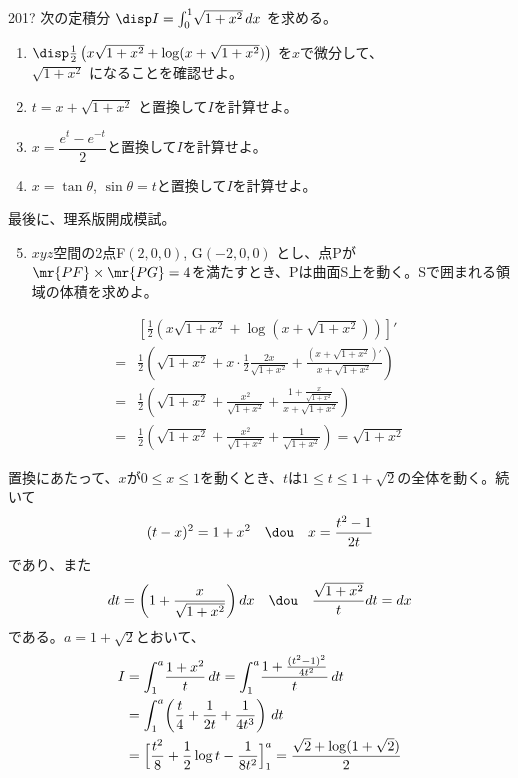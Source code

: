 \begin{thm}{201}{\hosi ?}{}
 次の定積分 $\disp I=\int_0^1\! \sqrt{1+x^2} \,dx$ を求める。
 \begin{enumerate}
  \item $\disp \frac{1}{2}\left(x\sqrt{1+x^2}+\log (x+\sqrt{1+x^2})\right)$ を$x$で微分して、\\ $\sqrt{1+x^2}$ になることを確認せよ。
  \item $t=x+\sqrt{1+x^2}$ と置換して$I$を計算せよ。
  \item $x=\dfrac{e^t-e^{-t}}{2}$と置換して$I$を計算せよ。
  \item $x=\tan\theta$, $\sin\theta=t$と置換して$I$を計算せよ。
 \end{enumerate}

 最後に、理系版開成模試。
 \begin{enumerate}
  \setcounter{enumi}{4}
  \item $xyz$空間の2点F$(2,0,0)$, G$(-2,0,0)$ とし、点Pが$\mr{PF}\times\mr{PG}=4$を満たすとき、Pは曲面S上を動く。Sで囲まれる領域の体積を求めよ。
 \end{enumerate}
\end{thm}

\begin{align*}
 &\left[\frac{1}{2}\left(x\sqrt{1+x^2}+\log (x+\sqrt{1+x^2})\right)\right]' \\
 =& \frac{1}{2}\left(\sqrt{1+x^2}+x\cdot\frac{1}{2}\frac{2x}{\sqrt{1+x^2}}+\frac{(x+\sqrt{1+x^2})'}{x+\sqrt{1+x^2}}\right) \\
 =& \frac{1}{2}\left(\sqrt{1+x^2}+\frac{x^2}{\sqrt{1+x^2}}+\frac{1+\frac{x}{\sqrt{1+x^2}}}{x+\sqrt{1+x^2}}\right) \\
 =& \frac{1}{2}\left(\sqrt{1+x^2}+\frac{x^2}{\sqrt{1+x^2}}+\frac{1}{\sqrt{1+x^2}}\right) = \sqrt{1+x^2}
\end{align*}

置換にあたって、$x$が$0\le x \le 1$を動くとき、$t$は$1\le t\le 1+\sqrt{2}$の全体を動く。続いて
\[ (t-x)^2=1+x^2 \quad\dou\quad x=\frac{t^2-1}{2t} \]
であり、また
\[ dt=\left(1+\frac{x}{\sqrt{1+x^2}}\right)dx \quad\dou\quad \frac{\sqrt{1+x^2}}{t}dt=dx \]
である。$a=1+\sqrt{2}$とおいて、
\begin{align*}
 I&=\int_1^a\! \frac{1+x^2}{t} \,dt = \int_1^a\!\frac{1+\frac{(t^2-1)^2}{4t^2}}{t} \,dt \\
 &= \int_1^a\!\left( \frac{t}{4}+\frac{1}{2t}+\frac{1}{4t^3}\right) \,dt \\
 &= \Bigl[ \frac{t^2}{8}+\frac{1}{2}\log t -\frac{1}{8t^2} \Bigr]_1^a = \frac{\sqrt{2}+\log (1+\sqrt{2})}{2}
\end{align*}

